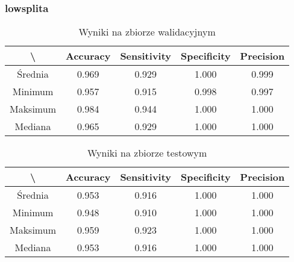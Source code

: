 \newpage
\subsubsection{lowsplita}

\begin{table}[!h]
	\centering
	\caption{Wyniki na zbiorze walidacyjnym}
	\vspace{6pt}
	{\footnotesize
		\begin{tabular}{|c|c|c|c|c|}
      \hline \textbackslash & Accuracy & Sensitivity & Specificity & Precision \\
      \hline Średnia & 0.969 & 0.929 & 1.000 & 0.999 \\
      \hline Minimum & 0.957 & 0.915 & 0.998 & 0.997 \\
      \hline Maksimum & 0.984 & 0.944 & 1.000 & 1.000 \\
      \hline Mediana & 0.965 & 0.929 & 1.000 & 1.000 \\
      \hline
		\end{tabular}
	}
	\vspace{0pt}
\end{table}

\begin{table}[!h]
	\centering
	\caption{Wyniki na zbiorze testowym}
	\vspace{6pt}
	{\footnotesize
		\begin{tabular}{|c|c|c|c|c|}
      \hline \textbackslash & Accuracy & Sensitivity & Specificity & Precision \\
      \hline Średnia & 0.953 & 0.916 & 1.000 & 1.000 \\
      \hline Minimum & 0.948 & 0.910 & 1.000 & 1.000 \\
      \hline Maksimum & 0.959 & 0.923 & 1.000 & 1.000 \\
      \hline Mediana & 0.953 & 0.916 & 1.000 & 1.000 \\
      \hline
		\end{tabular}
	}
	\vspace{0pt}
\end{table}
